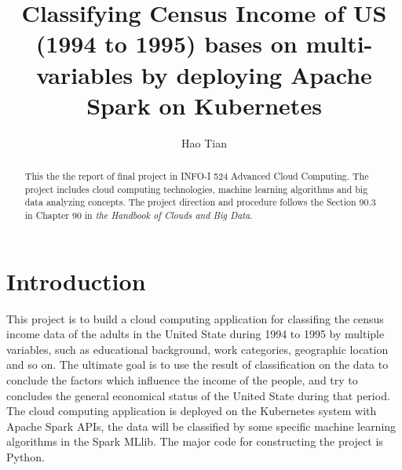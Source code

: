 
\title{Classifying Census Income of US (1994 to 1995) bases on multi-variables by deploying Apache Spark on Kubernetes}

\author{Hao Tian}


\renewcommand{\shortauthors}{H. Tian.}


\begin{abstract}
This the the report of final project in INFO-I 524 Advanced Cloud Computing. The project includes cloud computing technologies, machine learning algorithms and big data analyzing concepts. The project direction and procedure follows the Section 90.3 in Chapter 90 in \textit{the Handbook of Clouds and Big Data}.
\end{abstract}


\maketitle

\section{Introduction}
This project is to build a cloud computing application for classifing the census income data of the adults in the United State during 1994 to 1995 by multiple variables, such as educational background, work categories, geographic location and so on. The ultimate goal is to use the result of  classification on the data to conclude the factors which influence the income of the people, and try to concludes the general economical status of the United State during that period. The cloud computing application is deployed on the Kubernetes system with Apache Spark APIs, the data will be classified by some specific machine learning algorithms in the Spark MLlib. The major code for constructing the project is Python.

